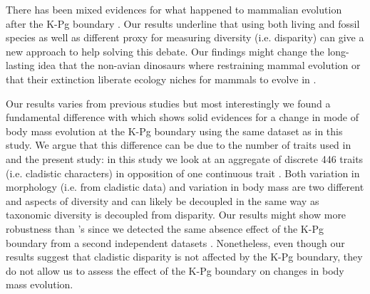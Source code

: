 \documentclass[12pt,letterpaper]{article}
\begin{document}

There has been mixed evidences for what happened to mammalian evolution after the K-Pg boundary \citep{Stadler12042011,meredithimpacts2011,O'Leary08022013,dosReis2014}.
Our results underline that using both living and fossil species as well as different proxy for measuring diversity (i.e. disparity) can give a new approach to help solving this debate. 
Our findings might change the long-lasting idea that the non-avian dinosaurs where restraining mammal evolution \citep{Lovergrove} or that their extinction liberate ecology niches for mammals to evolve in \citep{archibald2011extinction}.

Our results varies from previous studies \citep[][ see below]{Grossnickle2013,Wilson2013} but most interestingly we found a fundamental difference with \cite{Slater2012MEE} which shows solid evidences for a change in mode of body mass evolution at the K-Pg boundary using the same dataset as in this study.
We argue that this difference can be due to the number of traits used in \cite{Slater2012MEE} and the present study: in this study we look at an aggregate of discrete 446 traits (i.e. cladistic characters) in opposition of one continuous trait \citep[body mass in][]{Slater2012MEE}.
Both variation in morphology (i.e. from cladistic data) and variation in body mass are two different and aspects of diversity and can likely be decoupled in the same way as taxonomic diversity is decoupled from disparity.
Our results might show more robustness than \cite{Slater2012MEE}'s since we detected the same absence effect of the K-Pg boundary from a second independent datasets \citep[i.e.][]{beckancient2014}.
Nonetheless, even though our results suggest that cladistic disparity is not affected by the K-Pg boundary, they do not allow us to assess the effect of the K-Pg boundary on changes in body mass evolution.
\end{document}
